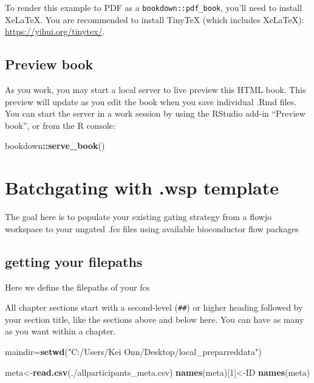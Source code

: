 \documentclass[
]{book}
\newenvironment{Shaded}{\begin{snugshade}}{\end{snugshade}}
\newcommand{\DecValTok}[1]{\textcolor[rgb]{0.00,0.00,0.81}{#1}}
\newcommand{\FunctionTok}[1]{\textcolor[rgb]{0.13,0.29,0.53}{\textbf{#1}}}
\newcommand{\NormalTok}[1]{#1}
\newcommand{\OtherTok}[1]{\textcolor[rgb]{0.56,0.35,0.01}{#1}}
\newcommand{\SpecialCharTok}[1]{\textcolor[rgb]{0.81,0.36,0.00}{\textbf{#1}}}
\newcommand{\StringTok}[1]{\textcolor[rgb]{0.31,0.60,0.02}{#1}}
\theoremstyle{definition}
\theoremstyle{definition}
\theoremstyle{definition}
\theoremstyle{definition}
\theoremstyle{remark}
\begin{document}
To render this example to PDF as a \texttt{bookdown::pdf\_book}, you'll need to install XeLaTeX. You are recommended to install TinyTeX (which includes XeLaTeX): \url{https://yihui.org/tinytex/}.

\section{Preview book}\label{preview-book}

As you work, you may start a local server to live preview this HTML book. This preview will update as you edit the book when you save individual .Rmd files. You can start the server in a work session by using the RStudio add-in ``Preview book'', or from the R console:

\begin{Shaded}
\begin{Highlighting}[]
\NormalTok{bookdown}\SpecialCharTok{::}\FunctionTok{serve\_book}\NormalTok{()}
\end{Highlighting}
\end{Shaded}

\chapter{Batchgating with .wsp template}\label{batchgating-with-.wsp-template}

The goal here is to populate your existing gating strategy
from a flowjo workspace to your ungated .fcs files using available bioconductor flow packages

\section{getting your filepaths}\label{getting-your-filepaths}

Here we define the filepaths of your fcs

All chapter sections start with a second-level (\texttt{\#\#}) or higher heading followed by your section title, like the sections above and below here. You can have as many as you want within a chapter.

\begin{Shaded}
\begin{Highlighting}[]
\NormalTok{maindir}\OtherTok{=}\FunctionTok{setwd}\NormalTok{(}\StringTok{"C:/Users/Kei Onn/Desktop/local\_preparreddata"}\NormalTok{)}

\NormalTok{meta}\OtherTok{\textless{}{-}}\FunctionTok{read.csv}\NormalTok{(}\StringTok{\textquotesingle{}./allparticipants\_meta.csv\textquotesingle{}}\NormalTok{)}
\FunctionTok{names}\NormalTok{(meta)[}\DecValTok{1}\NormalTok{]}\OtherTok{\textless{}{-}}\StringTok{\textquotesingle{}ID\textquotesingle{}}
\FunctionTok{names}\NormalTok{(meta)}
\end{Highlighting}
\end{Shaded}
\end{document}
